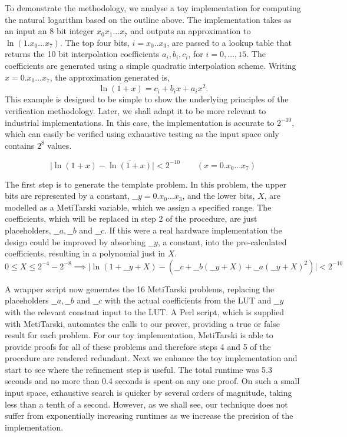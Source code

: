\documentclass{fac}
\newcommand{\abs}[1]{\lvert#1\rvert}
\begin{document}
To demonstrate the methodology, we analyse a toy implementation for computing the natural logarithm based on the outline above. The implementation takes as an input an 8 bit integer $x_0x_1...x_7$ and outputs an approximation to $\ln(1.x_0...x_7)$. The top four bits, $i = x_0..x_3$, are passed to a lookup table that returns the 10 bit interpolation coefficients $a_i, b_i, c_i$, for $i=0,...,15$. The coefficients are generated using a simple quadratic interpolation scheme. Writing $x=0.x_0...x_7$, the approximation generated is,
\[ \overline{\ln(1+x)}=c_i + b_i x +a_i x^2. \]
This example is designed to be simple to show the underlying principles of the verification methodology. Later, we shall adapt it to be more relevant to industrial implementations. In this case, the implementation is accurate to $2^{-10}$, which can easily be verified using exhaustive testing as the input space only contains $2^8$ values.

\[\abs{\ln(1+x)-\overline{\ln(1+x)}} <2^{-10} \qquad (x= 0.x_0...x_7) \]

The first step is to generate the template problem. In this problem, the upper bits are represented by a constant, $\_\_y=0.x_0...x_3$, and the lower bits, $X$, are modelled as a MetiTarski variable, which we assign a specified range. The coefficients, which will be replaced in step 2 of the procedure, are just placeholders, $\_\_a, \_\_b$ and $\_\_c$. If this were a real hardware implementation the design could be improved by absorbing $\_\_y$, a constant, into the pre-calculated coefficients, resulting in a polynomial just in $X$.
\[ 0\le X \le 2^{-4}-2^{-8} \implies \abs{\ln(1+\_\_y+X)-(\_\_c+\_\_b(\_\_y+X)+\_\_a(\_\_y+X)^2)} < 2^{-10} \]

A wrapper script now generates the 16 MetiTarski problems, replacing the placeholders $\_\_a, \_\_b$ and $\_\_c$ with the actual coefficients from the LUT and $\_\_y$ with the relevant constant input to the LUT. A Perl script, which is supplied with MetiTarski, automates the calls to our prover, providing a true or false result for each problem. For our toy implementation, MetiTarski is able to provide proofs for all of these problems and therefore steps 4 and 5 of the procedure are rendered redundant. Next we enhance the toy implementation and start to see where the refinement step is useful. The total runtime was 5.3 seconds and no more than 0.4 seconds is spent on any one proof. On such a small input space, exhaustive search is quicker by several orders of magnitude, taking less than a tenth of a second. However, as we shall see, our technique does not suffer from exponentially increasing runtimes as we increase the precision of the implementation. 
\end{document}

